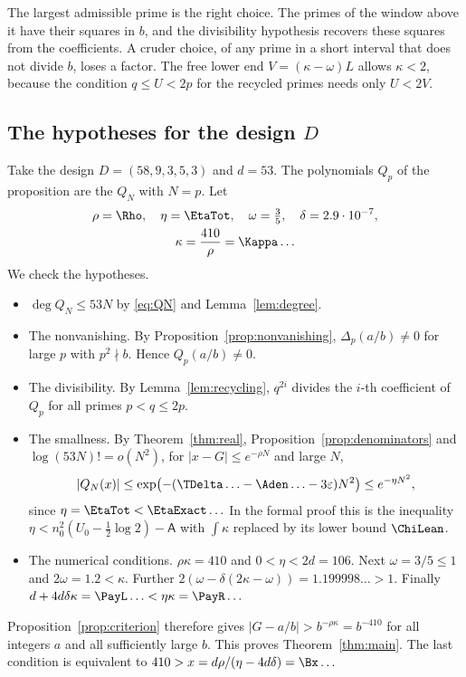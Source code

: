 The largest admissible prime is the right choice. The primes of the window above it have their squares in
$b$, and the divisibility hypothesis recovers these squares from the coefficients. A cruder choice, of any
prime in a short interval that does not divide $b$, loses a factor. The free lower end $V=(\kappa-\omega)L$
allows $\kappa<2$, because the condition $q\le U<2p$ for the recycled primes needs only $U<2V$.

\subsection{The hypotheses for the design $D$}
Take the design $D=(58,9,3,5,3)$ and $d=53$. The polynomials $Q_p$ of the proposition are the $Q_N$ with
$N=p$. Let
\begin{gather*}
 \rho=\Rho,\quad \eta=\EtaTot,\quad \omega=\tfrac35,\quad \delta=2.9\cdot10^{-7},\\
 \kappa=\frac{410}{\rho}=\Kappa\ldots
\end{gather*}
We check the hypotheses.
\begin{itemize}
\item $\deg Q_N\le53N$ by \eqref{eq:QN} and Lemma~\ref{lem:degree}.
\item The nonvanishing. By Proposition~\ref{prop:nonvanishing}, $\Delta_p(a/b)\ne0$ for large $p$ with
$p^2\nmid b$. Hence $Q_p(a/b)\ne0$.
\item The divisibility. By Lemma~\ref{lem:recycling}, $q^{2i}$ divides the $i$-th coefficient of $Q_p$ for all
primes $p<q\le2p$.
\item The smallness. By Theorem~\ref{thm:real}, Proposition~\ref{prop:denominators} and
$\log(53N)!=o(N^2)$, for $|x-G|\le e^{-\rho N}$ and large $N$,
\[
 |Q_N(x)|\le\exp\bigl(-(\TDelta\ldots-\Aden\ldots-3\varepsilon)N^2\bigr)\le e^{-\eta N^2},
\]
since $\eta=\EtaTot<\EtaExact\ldots$ In the formal proof this is the inequality
$\eta<n_0^2(U_0-\frac12\log2)-\mathsf A$ with $\int\kappa$ replaced by its lower bound $\ChiLean$.
\item The numerical conditions. $\rho\kappa=410$ and $0<\eta<2d=106$. Next $\omega=3/5\le1$ and
$2\omega=1.2<\kappa$. Further $2(\omega-\delta(2\kappa-\omega))=1.199998\ldots>1$. Finally
$d+4d\delta\kappa=\PayL\ldots<\eta\kappa=\PayR\ldots$
\end{itemize}
Proposition~\ref{prop:criterion} therefore gives $|G-a/b|>b^{-\rho\kappa}=b^{-410}$ for all integers $a$ and all
sufficiently large $b$. This proves Theorem~\ref{thm:main}. The last condition is equivalent to
$410>x=d\rho/(\eta-4d\delta)=\Bx\ldots$

